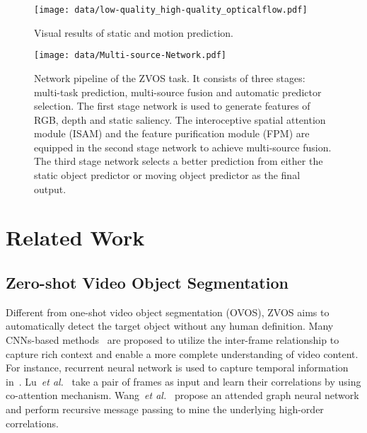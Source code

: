 \documentclass[sigconf]{acmart}
\begin{document}
\begin{figure}[t]
\texttt{[image: data/low-quality\_high-quality\_opticalflow.pdf]}\\
        \centering
        \caption{Visual results of static and motion prediction.}
\label{fig:Figure2}
\vspace{-5mm}
\end{figure} 

\begin{figure*}
    \texttt{[image: data/Multi-source-Network.pdf]}\\ \centering
    \caption{Network pipeline of the ZVOS task. It consists of three stages: multi-task prediction, multi-source fusion and automatic predictor selection. The first stage network is used to generate features of RGB, depth and static saliency. The interoceptive spatial attention module (ISAM) and the feature purification module (FPM) are equipped in the second stage network to achieve multi-source fusion. The third stage network selects a better prediction from either the static object predictor or moving object predictor as the final output.} 		
    \label{fig:Figure3}
\end{figure*} 

\section{Related Work}
\subsection{Zero-shot Video Object Segmentation}
Different from one-shot video object segmentation (OVOS), ZVOS aims to automatically detect the target object without any human definition. Many CNNs-based methods~\cite{PDB, MotAdapt, EPO, AGS, COSNet, AGNN} are proposed to utilize the inter-frame relationship to capture rich context and enable a more complete understanding of video content. For instance, recurrent neural network is used to capture temporal information in~\cite{PDB,AGS}. Lu~\textit{et al.}~\cite{COSNet} take a pair of frames as input and learn their correlations by using co-attention mechanism. Wang~\textit{et al.}~\cite{AGNN} propose an attended graph neural network and perform recursive message passing to mine the underlying high-order correlations.
\end{document}
